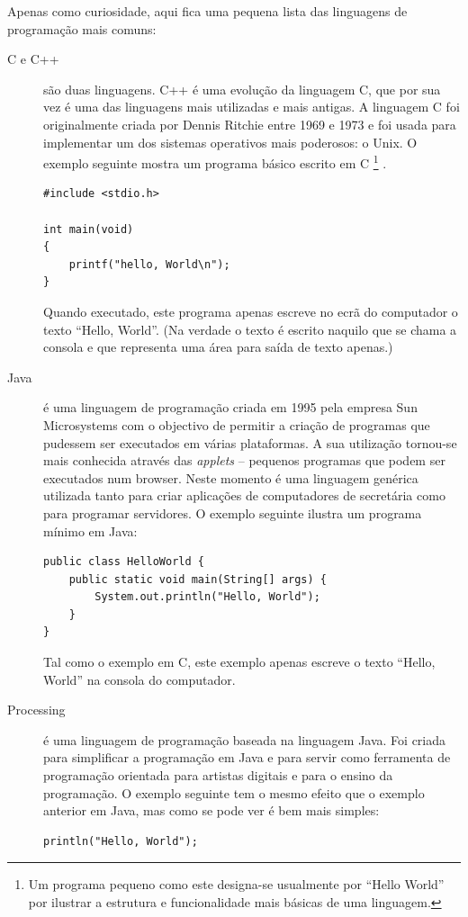 Apenas como curiosidade, aqui fica uma pequena lista das linguagens de programação mais comuns:
\begin{description}

\item[C e C++] são duas linguagens. C++ é uma evolução da linguagem C, que por sua vez é uma das linguagens mais utilizadas e mais antigas. A linguagem C foi originalmente criada por Dennis Ritchie entre 1969 e 1973 e foi usada para implementar um dos sistemas operativos mais poderosos: o Unix. O exemplo seguinte mostra um programa básico escrito em C%
\footnote{
Um programa pequeno como este designa-se usualmente por ``Hello World'' por ilustrar a estrutura e funcionalidade mais básicas de uma linguagem.
}%
.
\begin{lstlisting}
#include <stdio.h>
 
int main(void)
{
    printf("hello, World\n");
}
\end{lstlisting}
Quando executado, este programa apenas escreve no ecrã do computador o texto ``Hello, World''. (Na verdade o texto é escrito naquilo que se chama a consola e que representa uma área para saída de texto apenas.)

\item[Java] é uma linguagem de programação criada em 1995 pela empresa Sun Microsystems com o objectivo de permitir a criação de programas que pudessem ser executados em várias plataformas. A sua utilização tornou-se mais conhecida através das \emph{applets} -- pequenos programas que podem ser executados num browser. Neste momento é uma linguagem genérica utilizada tanto para criar aplicações de computadores de secretária como para programar servidores.
O exemplo seguinte ilustra um programa mínimo em Java:
\begin{lstlisting}
public class HelloWorld {
    public static void main(String[] args) {
        System.out.println("Hello, World");
    }
}
\end{lstlisting}
Tal como o exemplo em C, este exemplo apenas escreve o texto ``Hello, World'' na consola do computador.

\item[Processing] é uma linguagem de programação baseada na linguagem Java. Foi criada para simplificar a programação em Java e para servir como ferramenta de programação orientada para artistas digitais e para o ensino da programação. O exemplo seguinte tem o mesmo efeito que o exemplo anterior em Java, mas como se pode ver é bem mais simples:
\begin{lstlisting}
println("Hello, World");
\end{lstlisting}


\end{description}
